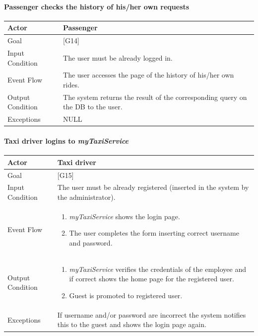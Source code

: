 \documentclass[a4paper,11pt]{report} %
\newcommand{\mts}{\mbox{\normalfont\itshape myTaxiService}}
\begin{document}
	\pagebreak
	
	\paragraph{Passenger checks the history of his/her own requests}
	\begin{center}
		\begin{tabular}{| l | p{9cm} |}\hline
			Actor & Passenger\\\hline
			Goal & {[}G14{]} \\\hline
			Input Condition & The user must be already logged in.\\\hline
			Event Flow & The user accesses the page of the history of his/her own rides.\\\hline
			Output Condition & The system returns the result of the corresponding query on the DB to the user.\\\hline
			Exceptions & NULL\\\hline
		\end{tabular}
	\end{center}	
	
	\pagebreak
	
	\paragraph{Taxi driver logins to \mts{}}
	\begin{center}
		\begin{tabular}{| l | p{9cm} |}\hline
			Actor & Taxi driver\\\hline
			Goal & {[}G15{]} \\\hline
			Input Condition & The user must be already registered (inserted in the system by the administrator).\\\hline
			Event Flow & \begin{enumerate}
				\item \mts{} shows the login page.
				\item The user completes the form inserting correct username and password.
			\end{enumerate}\\\hline
			Output Condition & \begin{enumerate}
				\item \mts{} verifies the credentials of the employee and if correct shows the home page for the registered user.
				\item Guest is promoted to registered user.
			\end{enumerate}\\\hline
			Exceptions & If username and/or password are incorrect the system notifies this to the guest and shows the login page again.\\\hline
		\end{tabular}
	\end{center}
	
\end{document}
